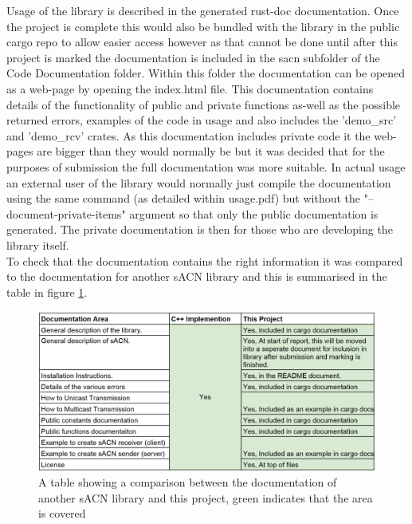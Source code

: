 \documentclass[11pt,a4paper]{article}
\begin{document}
Usage of the library is described in the generated rust-doc documentation. Once the project is complete this would also be bundled with the library in the public cargo repo to allow easier access however as that cannot be done until after this project is marked the documentation is included in the sacn subfolder of the Code Documentation folder. Within this folder the documentation can be opened as a web-page by opening the index.html file. This documentation contains details of the functionality of public and private functions as-well as the possible returned errors, examples of the code in usage and also includes the 'demo\_src' and 'demo\_rcv' crates. As this documentation includes private code it the web-pages are bigger than they would normally be but it was decided that for the purposes of submission the full documentation was more suitable. In actual usage an external user of the library would normally just compile the documentation using the same command (as detailed within usage.pdf) but without the "--document-private-items" argument so that only the public documentation is generated. The private documentation is then for those who are developing the library itself.\\

To check that the documentation contains the right information it was compared to the documentation for another sACN library \cite{C_IMPL} and this is summarised in the table in figure \ref{DOC_COMPARISON}.

\begin{figure}[H]
	\includegraphics[width=\textwidth]{documentation-comparison-table}
	\caption{A table showing a comparison between the documentation of another sACN library \cite{C_IMPL} and this project, green indicates that the area is covered}
	\label{DOC_COMPARISON}
\end{figure}
\end{document}
